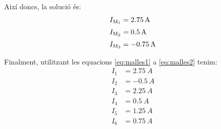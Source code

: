 \begin{exemple}
    Així doncs, la solució és:
    \begin{align*}
        I_\mathrm{M_1} &= \SI{2,75}{A} \\[0.5ex]
        I_\mathrm{M_2} &= \SI{0,5}{A} \\[0.5ex]
        I_\mathrm{M_3} &= \SI{-0,75}{A}
    \end{align*}

    Finalment, utilitzant les equacions \eqref{eq:malles1} a \eqref{eq:malles2} tenim:
    \begin{align*}
        I_1 &= \SI{2,75}{A} \\[0.5ex]
        I_2 &= \SI{-0,5}{A} \\[0.5ex]
        I_3 &= \SI{2,25}{A} \\[0.5ex]
        I_4 &= \SI{0,5}{A} \\[0.5ex]
        I_5 &=  \SI{1,25}{A} \\[0.5ex]
        I_6 &= \SI{0,75}{A}
    \end{align*}

\end{exemple}

